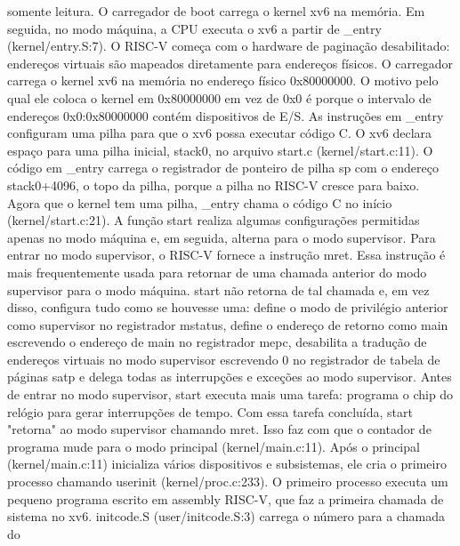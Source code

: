 somente  leitura.  O  carregador  de  boot  carrega  o  kernel  xv6  na  memória.  Em  seguida,  no  modo  máquina,  a  CPU  executa  
o  xv6  a  partir  de  _entry  (kernel/entry.S:7).  O  RISC-V  começa  com  o  hardware  de  paginação  desabilitado:  endereços  
virtuais  são  mapeados  diretamente  para  endereços  físicos.
 O  carregador  carrega  o  kernel  xv6  na  memória  no  endereço  físico  0x80000000.  O  motivo  pelo  qual  ele  coloca  o  
kernel  em  0x80000000  em  vez  de  0x0  é  porque  o  intervalo  de  endereços  0x0:0x80000000  contém  dispositivos  de  E/S.
 As  instruções  em  _entry  configuram  uma  pilha  para  que  o  xv6  possa  executar  código  C.  O  xv6  declara  espaço  para  
uma  pilha  inicial,  stack0,  no  arquivo  start.c  (kernel/start.c:11).  O  código  em  _entry  carrega  o  registrador  de  ponteiro  de  
pilha  sp  com  o  endereço  stack0+4096,  o  topo  da  pilha,  porque  a  pilha  no  RISC-V  cresce  para  baixo.  Agora  que  o  kernel  
tem  uma  pilha,  _entry  chama  o  código  C  no  início  (kernel/start.c:21).
 A  função  start  realiza  algumas  configurações  permitidas  apenas  no  modo  máquina  e,  em  seguida,  alterna  para  o  
modo  supervisor.  Para  entrar  no  modo  supervisor,  o  RISC-V  fornece  a  instrução  mret.  Essa  instrução  é  mais  
frequentemente  usada  para  retornar  de  uma  chamada  anterior  do  modo  supervisor  para  o  modo  máquina.  start  não  
retorna  de  tal  chamada  e,  em  vez  disso,  configura  tudo  como  se  houvesse  uma:  define  o  modo  de  privilégio  anterior  como  
supervisor  no  registrador  mstatus,  define  o  endereço  de  retorno  como  main  escrevendo  o  endereço  de  main  no  registrador  
mepc,  desabilita  a  tradução  de  endereços  virtuais  no  modo  supervisor  escrevendo  0  no  registrador  de  tabela  de  páginas  
satp  e  delega  todas  as  interrupções  e  exceções  ao  modo  supervisor.
 Antes  de  entrar  no  modo  supervisor,  start  executa  mais  uma  tarefa:  programa  o  chip  do  relógio  
para  gerar  interrupções  de  tempo.  Com  essa  tarefa  concluída,  start  "retorna"  ao  modo  supervisor  
chamando  mret.  Isso  faz  com  que  o  contador  de  programa  mude  para  o  modo  principal  (kernel/main.c:11).
 Após  o  principal  (kernel/main.c:11)  inicializa  vários  dispositivos  e  subsistemas,  ele  cria  o  primeiro  processo  
chamando  userinit  (kernel/proc.c:233).  O  primeiro  processo  executa  um  pequeno  programa  escrito  em  assembly  RISC-V,  
que  faz  a  primeira  chamada  de  sistema  no  xv6.  initcode.S  (user/initcode.S:3)  carrega  o  número  para  a  chamada  do  
